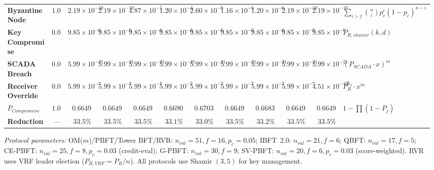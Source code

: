\begin{table}[t]
\begin{tabular}{@{}lrrrrrrrrrrl@{}}
\textbf{Byzantine Node} & $1.0$ & $2.19 \times 10^{-10}$ & $2.19 \times 10^{-10}$ & $4.87 \times 10^{-5}$ & $1.20 \times 10^{-4}$ & $2.60 \times 10^{-8}$ & $1.16 \times 10^{-6}$ & $1.20 \times 10^{-6}$ & $2.19 \times 10^{-10}$ & $2.19 \times 10^{-10}$ & $\sum_{i>f} \binom{n}{i} p_c^i (1-p_c)^{n-i}$ \\
\textbf{Key Compromise} & $0.0100$ & $9.85 \times 10^{-6}$ & $9.85 \times 10^{-6}$ & $9.85 \times 10^{-6}$ & $9.85 \times 10^{-6}$ & $9.85 \times 10^{-6}$ & $9.85 \times 10^{-6}$ & $9.85 \times 10^{-6}$ & $9.85 \times 10^{-6}$ & $9.85 \times 10^{-6}$ & $P_{R,shamir}(k,d)$ \\
\textbf{SCADA Breach} & $0.0100$ & $5.99 \times 10^{-21}$ & $5.99 \times 10^{-21}$ & $5.99 \times 10^{-21}$ & $5.99 \times 10^{-21}$ & $5.99 \times 10^{-21}$ & $5.99 \times 10^{-21}$ & $5.99 \times 10^{-21}$ & $5.99 \times 10^{-21}$ & $5.99 \times 10^{-21}$ & $(P_{SCADA} \cdot x)^m$ \\
\textbf{Receiver Override} & $0.0100$ & $5.99 \times 10^{-7}$ & $5.99 \times 10^{-7}$ & $5.99 \times 10^{-7}$ & $5.99 \times 10^{-7}$ & $5.99 \times 10^{-7}$ & $5.99 \times 10^{-7}$ & $5.99 \times 10^{-7}$ & $5.99 \times 10^{-7}$ & $4.51 \times 10^{-12}$ & $P_R^{k_2} \cdot x^m$ \\
\midrule
\textbf{$P_{Compromise}$} & $1.0$ & $0.6649$ & $0.6649$ & $0.6649$ & $0.6690$ & $0.6703$ & $0.6649$ & $0.6683$ & $0.6649$ & $0.6649$ & $1 - \prod(1 - P_j)$ \\
\textbf{Reduction} & --- & $33.5\%$ & $33.5\%$ & $33.5\%$ & $33.1\%$ & $33.0\%$ & $33.5\%$ & $33.2\%$ & $33.5\%$ & $33.5\%$ &  \\
\bottomrule
\end{tabular}
\vspace{2pt}
\par\noindent\scriptsize\textit{Protocol parameters:} OM($m$)/PBFT/Tower BFT/RVR: $n_{val}=51, f=16, p_c=0.05$; IBFT~2.0: $n_{val}=21, f=6$; QBFT: $n_{val}=17, f=5$; CE-PBFT: $n_{val}=25, f=8, p_c=0.03$ (credit-eval); G-PBFT: $n_{val}=30, f=9$; SV-PBFT: $n_{val}=20, f=6, p_c=0.03$ (score-weighted). RVR uses VRF leader election ($P_{R,VRF} = P_R / n$). All protocols use Shamir $(3,5)$ for key management.
\end{table}
